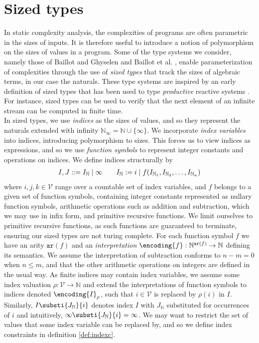 \chapter{Sized types}\label{sec:sizedtypes}
In static complexity analysis, the complexities of programs are often parametric in the sizes of inputs. It is therefore useful to introduce a notion of polymorphism on the sizes of values in a program. Some of the type systems we consider, namely those of Baillot and Ghyselen \cite{BaillotGhyselen2021} and Baillot et al. \cite{BaillotEtAl2021}, enable parameterization of complexities through the use of \textit{sized types} that track the sizes of algebraic terms, in our case the naturals. These type systems are inspired by an early definition of sized types that has been used to type \textit{productive} reactive systems \cite{HughesEtAl1996}. For instance, sized types can be used to verify that the next element of an infinite stream can be computed in finite time.\\

In sized types, we use \textit{indices} as the sizes of values, and so they represent the naturals extended with infinity $\mathbb{N}_\infty = \mathbb{N} \cup \{\infty\}$. We incorporate \textit{index variables} into indices, introducing polymorphism to sizes. This forces us to view indices as expressions, and so we use \textit{function symbols} to represent integer constants and operations on indices. We define indices structurally by
\begin{align*}
    \kern0em I,J ::= I_\mathbb{N} \mid \infty\quad\quad I_\mathbb{N} := i \mid f(I_{\mathbb{N}_1},I_{\mathbb{N}_2},\dots,I_{\mathbb{N}_n})
\end{align*}
where $i,j,k \in \mathcal{V}$ range over a countable set of index variables, and $f$ belongs to a given set of function symbols, containing integer constants represented as nullary function symbols, arithmetic operations such as addition and subtraction, which we may use in infix form, and primitive recursive functions. We limit ourselves to primitive recursive functions, as such functions are guaranteed to terminate, ensuring our sized types are not turing complete. For each function symbol $f$ we have an arity $\texttt{ar}(f)$ and an \textit{interpretation} $\encoding{f} : \mathbb{N}^{\texttt{ar}(f)} \rightarrow \mathbb{N}$ defining its semantics. We assume the interpretation of subtraction conforms to $n-m = 0$ when $n \leq m$, and that the other arithmetic operations on integers are defined in the usual way. As finite indices may contain index variables, we assume some index valuation $\rho : \mathcal{V} \rightarrow \mathbb{N}$ and extend the interpretations of function symbols to indices denoted $\encoding{I}_\rho$, such that $i \in \mathcal{V}$ is replaced by $\rho(i)$ in $I$. Similarly, $I\substi{J_\mathbb{N}}{i}$ denotes index $I$ with $J_\mathbb{N}$ substituted for occurrences of $i$ and intuitively, $\infty\substi{J_\mathbb{N}}{i} = \infty$. We may want to restrict the set of values that some index variable can be replaced by, and so we define index constraints in definition \ref{def:indexc}.

